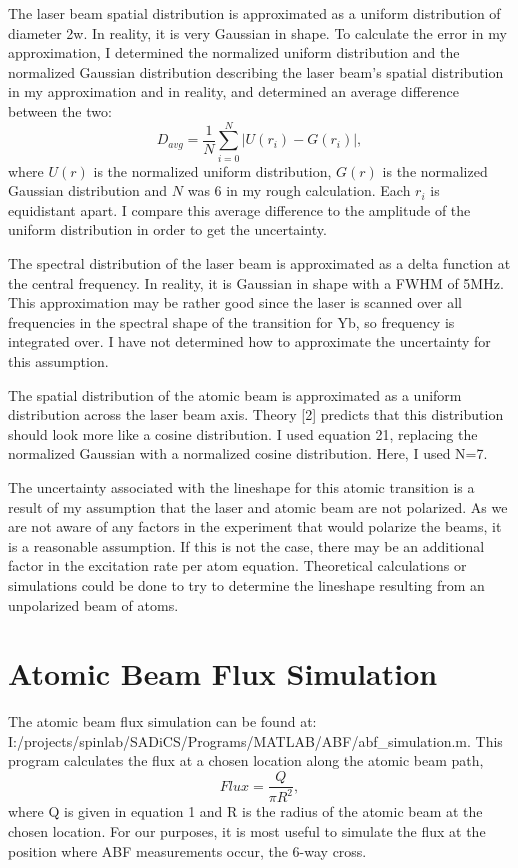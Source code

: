 \documentclass[12pt, a4paper]{article}
\begin{document}
The laser beam spatial distribution is approximated as a uniform distribution of diameter 2w. In reality, it is very Gaussian in shape. To calculate the error in my approximation, I determined the normalized uniform distribution and the normalized Gaussian distribution describing the laser beam's spatial distribution in my approximation and in reality, and determined an average difference between the two:
\begin{equation}
D_{avg}=\frac{1}{N}\sum_{i=0}^{N}{|U(r_i)-G(r_i)|},
\end{equation}
where $U(r)$ is the normalized uniform distribution, $G(r)$ is the normalized Gaussian distribution and $N$ was 6 in my rough calculation. Each $r_i$ is equidistant apart. I compare this average difference to the amplitude of the uniform distribution in order to get the uncertainty.

The spectral distribution of the laser beam is approximated as a delta function at the central frequency. In reality, it is Gaussian in shape with a FWHM of 5MHz. This approximation may be rather good since the laser is scanned over all frequencies in the spectral shape of the transition for Yb, so frequency is integrated over. I have not determined how to approximate the uncertainty for this assumption.

The spatial distribution of the atomic beam is approximated as a uniform distribution across the laser beam axis. Theory [2] predicts that this distribution should look more like a cosine distribution. I used equation 21, replacing the normalized Gaussian with a normalized cosine distribution. Here, I used N=7.

The uncertainty associated with the lineshape for this atomic transition is a result of my assumption that the laser and atomic beam are not polarized. As we are not aware of any factors in the experiment that would polarize the beams, it is a reasonable assumption. If this is not the case, there may be an additional factor in the excitation rate per atom equation. Theoretical calculations or simulations could be done to try to determine the lineshape resulting from an unpolarized beam of atoms. 

\section{Atomic Beam Flux Simulation}
The atomic beam flux simulation can be found at: \\\footnotesize I:/projects/spinlab/SADiCS/Programs/MATLAB/ABF/abf\_simulation.m. \normalsize This program calculates the flux at a chosen location along the atomic beam path,
\begin{equation}
Flux = \frac{Q}{\pi R^{2}},
\end{equation}
where Q is given in equation 1 and R is the radius of the atomic beam at the chosen location. For our purposes, it is most useful to simulate the flux at the position where ABF measurements occur, the 6-way cross. 
\end{document}
